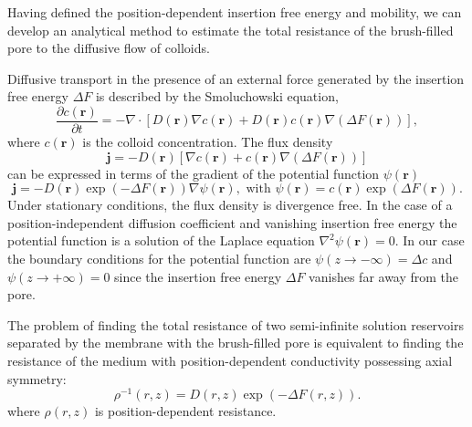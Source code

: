 \documentclass[12pt, a4paper]{article}
\newcommand\todo[1]{\textcolor{red}{#1}}
\begin{document}

Having defined the position-dependent insertion free energy and mobility, we can develop an analytical method to estimate the total resistance of the brush-filled pore to the diffusive flow of colloids.

Diffusive transport in the presence of an external force generated by the insertion free energy $\Delta F$ is described by the Smoluchowski equation,
\begin{equation}
    \frac{\partial c(\bm{r})}{\partial t}=-\nabla \cdot \left[D(\bm{r}) \nabla c({\bm{r}})+D(\bm{r})c({\bm{r}})\nabla(\Delta F(\bm{r}))\right],
    \label{eq:Smoluch}
\end{equation}
where $c(\bm{r})$ is the colloid concentration.
The flux density 
\begin{equation}
    \bm{j}=- D(\bm{r})\left[\nabla c({\bm{r}})+c({\bm{r}}) \nabla \left(\Delta F(\bm{r})\right)\right]
    \label{eq:j}
\end{equation}
can be expressed in terms of the gradient of the potential function $\psi(\bm{r})$
\begin{equation}
    \bm{j}=- D(\bm{r}) \exp(-\Delta F(\bm{r}))  \nabla \psi(\bm{r}), \text{ with } \psi(\bm{r})=c(\bm{r})\exp(\Delta F(\bm{r})).
    \label{eq:psi}
\end{equation}
Under stationary conditions, the flux density is divergence free. In the case of a position-independent diffusion coefficient and vanishing insertion free energy the potential function is a solution of the Laplace equation $\nabla^2 \psi(\bm{r})=0$.
In our case the boundary conditions for the potential function are $\psi(z\rightarrow -\infty)=\Delta c$ and $\psi(z\rightarrow +\infty)=0$ since the insertion free energy $\Delta F$ vanishes far away from the pore.

The problem of finding the total resistance of two semi-infinite solution reservoirs separated by the membrane with the brush-filled pore is equivalent to finding the resistance of the medium with position-dependent conductivity possessing axial symmetry:
\begin{equation}
    \rho^{-1} (r,z)= D(r,z)\exp(-\Delta F(r,z)).
    \label{eq:rho}
\end{equation}
where $\rho(r,z)$ is position-dependent resistance.
\end{document}
